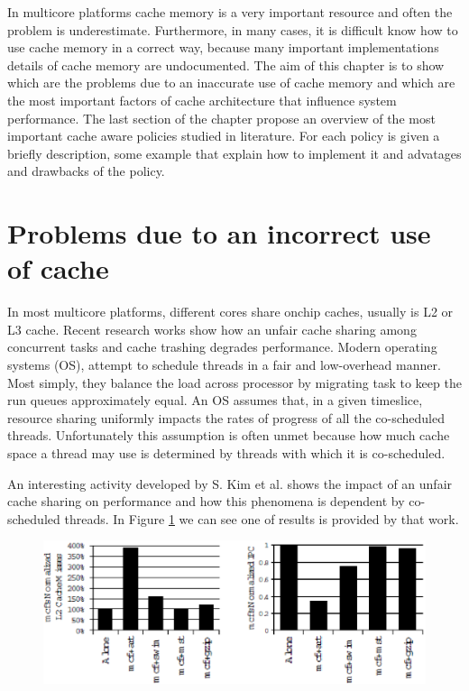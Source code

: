 In multicore platforms cache memory is a very important resource and often the problem is underestimate. Furthermore, in many cases, it is difficult know 
how to use cache memory in a correct way, because many important implementations details of cache memory are undocumented. The aim of this chapter is 
to show which are the problems due to an inaccurate use of cache memory and which are the most important factors of cache architecture that influence 
system performance. The last section of the chapter propose an overview of the most important cache aware policies studied in literature. For each policy 
is given a briefly description, some example that explain how to implement it and advatages and drawbacks of the policy.

\section{Problems due to an incorrect use of cache}
\label{sec:s1}

In most multicore platforms, different cores share onchip caches, usually is L2 or L3 cache. Recent research works show how an unfair cache sharing
among concurrent tasks and cache trashing degrades performance. Modern operating systems (OS), attempt to schedule threads in a
fair and low-overhead manner.
Most simply, they balance the load across processor by migrating task to keep the run queues approximately equal. An OS assumes that,
in a given timeslice, resource sharing uniformly impacts the rates of progress of all the co-scheduled threads.
Unfortunately this assumption is often unmet because how much cache space a thread may use is determined by threads with which it is co-scheduled.

An interesting activity developed by S. Kim et al. shows the impact of an unfair cache sharing on performance and how this phenomena is dependent by
co-scheduled threads. In Figure \ref{fig:gzip_miss} we can see one of results is provided by that work.

\begin{figure}[htbp]
\centering
\includegraphics[width=\widefigure]{images/chandra_gzip}
\caption{}
\label{fig:gzip_miss}
\end{figure}

